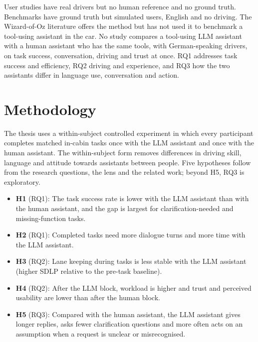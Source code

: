 \documentclass[
    a4paper,
    11pt,
    DIV=11,
    bigheadings,
    idxtotoc,
    listof=totoc,
    bibtotoc,
    halfparskip,
    cleardoubleempty,
    openright,
    oneside
]{scrartcl}
\begin{document}
User studies have real drivers but no human reference and no ground truth.
Benchmarks have ground truth but simulated users, English and no driving.
The Wizard-of-Oz literature offers the method but has not used it to benchmark a tool-using assistant in the car.
No study compares a tool-using LLM assistant with a human assistant who has the same tools, with German-speaking drivers, on task success, conversation, driving and trust at once.
RQ1 addresses task success and efficiency, RQ2 driving and experience, and RQ3 how the two assistants differ in language use, conversation and action.

\section{Methodology}

The thesis uses a within-subject controlled experiment in which every participant completes matched in-cabin tasks once with the LLM assistant and once with the human assistant.
The within-subject form removes differences in driving skill, language and attitude towards assistants between people.
Five hypotheses follow from the research questions, the lens and the related work; beyond H5, RQ3 is exploratory.

\begin{itemize}
    \item \textbf{H1} (RQ1): The task success rate is lower with the LLM assistant than with the human assistant, and the gap is largest for clarification-needed and missing-function tasks.
    \item \textbf{H2} (RQ1): Completed tasks need more dialogue turns and more time with the LLM assistant.
    \item \textbf{H3} (RQ2): Lane keeping during tasks is less stable with the LLM assistant (higher SDLP relative to the pre-task baseline).
    \item \textbf{H4} (RQ2): After the LLM block, workload is higher and trust and perceived usability are lower than after the human block.
    \item \textbf{H5} (RQ3): Compared with the human assistant, the LLM assistant gives longer replies, asks fewer clarification questions and more often acts on an assumption when a request is unclear or misrecognised.
\end{itemize}
\end{document}
